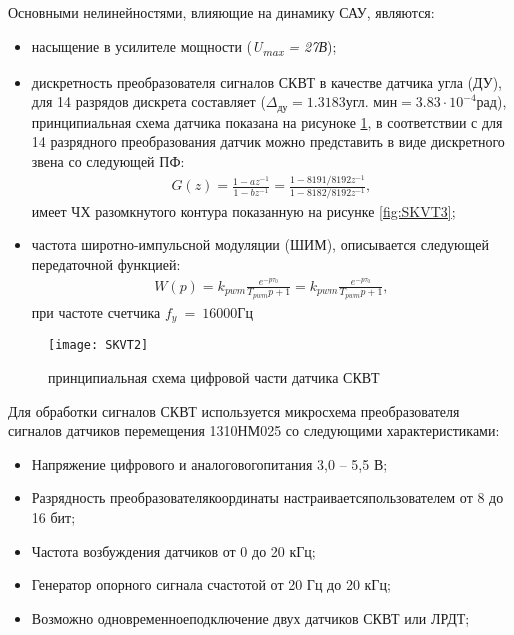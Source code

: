 Основными нелинейностями, влияющие на динамику САУ, являются:
\begin{itemize}
	\item насыщение в усилителе мощности (\textit{U\textsubscript{max} =  27В});
	\item дискретность преобразователя сигналов  СКВТ в качестве датчика угла (ДУ), для 14 разрядов дискрета составляет ($\varDelta_{\textit{ду}} = 1.3183 \textit{угл. мин} = 3.83 \cdot 10^{-4} \textit{рад}$), принципиальная схема датчика показана на рисуноке \ref{fig:SKVT2}, в соответствии с \cite[]{1310HM025} для 14 разрядного преобразования датчик можно представить в виде дискретного звена со следующей ПФ:
	\begin{equation}
	\label{eq:p4:SKVT}
	\begin{alignedat}{2}
	G ( z ) =\frac{ 1 - a z^{-1} }{ 1 - b z^{-1} } = \frac{ 1 - 8191/8192 z^{-1} }{ 1 - 8182/8192 z^{-1} },
	\end{alignedat}
	\end{equation}
	имеет ЧХ разомкнутого контура показанную на рисунке \ref{fig:SKVT3};
	\item частота широтно-импульсной модуляции (ШИМ), описывается следующей передаточной функцией:
	\begin{equation}
	\label{eq:p4:PWM}
	\begin{alignedat}{2}
	W ( p ) =k_{pwm} \frac{ e^{-p \tau_0 } }{ T_{pwm} p + 1 } = k_{pwm} \frac{ e^{-p \tau_0 } }{ T_{pwm} p + 1 },
	\end{alignedat}
	\end{equation}
	при частоте счетчика $f_y~=~16000$Гц
\end{itemize} 

\begin{figure}[ht]
	\centering
	\texttt{[image: SKVT2]} 
	\caption{принципиальная схема цифровой части датчика СКВТ \cite[]{1310HM025}}
	\label{fig:SKVT2}
\end{figure}

Для обработки сигналов СКВТ используется микросхема преобразователя сигналов датчиков перемещения
1310НМ025 со следующими характеристиками:
\begin{itemize}
	\item Напряжение цифрового и аналоговогопитания 3,0 – 5,5 В;
	\item Разрядность преобразователякоординаты настраиваетсяпользователем от 8 до 16 бит;
	\item Частота возбуждения датчиков от 0 до 20 кГц;
	\item Генератор опорного сигнала счастотой от 20 Гц до 20 кГц;
	\item Возможно одновременноеподключение двух датчиков СКВТ или ЛРДТ;

\end{itemize}

